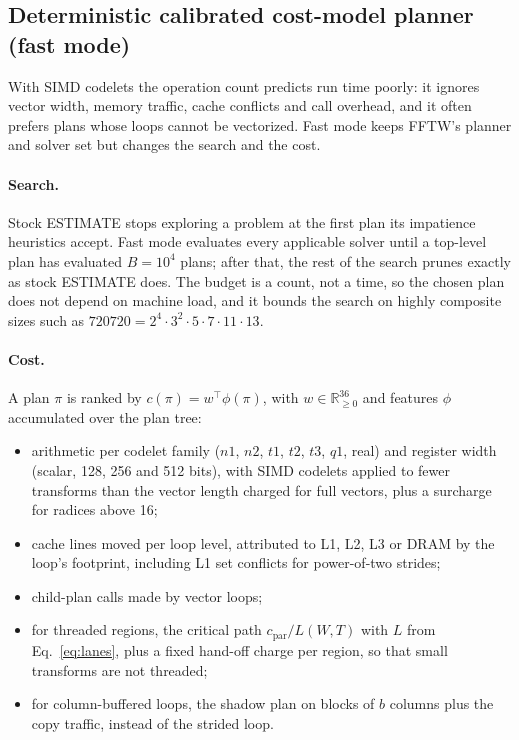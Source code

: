 \documentclass[10pt]{article}
\theoremstyle{definition}
\begin{document}
\subsection{Deterministic calibrated cost-model planner (fast mode)}\label{sec:planner}

With SIMD codelets the operation count predicts run time poorly: it ignores vector width, memory traffic, cache conflicts and call overhead, and it often prefers plans whose loops cannot be vectorized. Fast mode keeps FFTW's planner and solver set but changes the search and the cost.

\paragraph{Search.} Stock ESTIMATE stops exploring a problem at the first plan its impatience heuristics accept. Fast mode evaluates every applicable solver until a top-level plan has evaluated $B=10^4$ plans; after that, the rest of the search prunes exactly as stock ESTIMATE does. The budget is a count, not a time, so the chosen plan does not depend on machine load, and it bounds the search on highly composite sizes such as $720720=2^4\cdot3^2\cdot5\cdot7\cdot11\cdot13$.

\paragraph{Cost.} A plan $\pi$ is ranked by $c(\pi)=w^\top\phi(\pi)$, with $w\in\mathbb{R}^{36}_{\ge0}$ and features $\phi$ accumulated over the plan tree:
\begin{itemize}
\item arithmetic per codelet family ($n1$, $n2$, $t1$, $t2$, $t3$, $q1$, real) and register width (scalar, 128, 256 and 512 bits), with SIMD codelets applied to fewer transforms than the vector length charged for full vectors, plus a surcharge for radices above 16;
\item cache lines moved per loop level, attributed to L1, L2, L3 or DRAM by the loop's footprint, including L1 set conflicts for power-of-two strides;
\item child-plan calls made by vector loops;
\item for threaded regions, the critical path $c_{\text{par}}/L(W,T)$ with $L$ from Eq.~\eqref{eq:lanes}, plus a fixed hand-off charge per region, so that small transforms are not threaded;
\item for column-buffered loops, the shadow plan on blocks of $b$ columns plus the copy traffic, instead of the strided loop.
\end{itemize}
\end{document}
